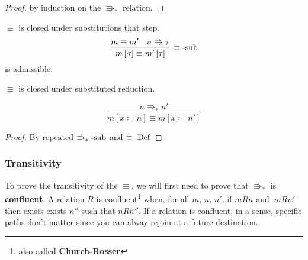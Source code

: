 \begin{proof}
by induction on the $\Rrightarrow_{\ast}$ relation. 
\end{proof}
\begin{lem}
$\equiv$ is closed under substitutions that step.
\[
\frac{m\equiv m'\quad\sigma\Rrightarrow\tau}{m\left[\sigma\right]\equiv m'\left[\tau\right]}\,\operatorname{\equiv-sub}
\]
is admissible.
\end{lem}

\begin{cor}
$\equiv$ is closed under substituted reduction.
\end{cor}

\[
\frac{n\Rrightarrow_{\ast}n'}{m\left[x\coloneqq n\right]\equiv m\left[x\coloneqq n'\right]}
\]

\begin{proof}
By repeated $\operatorname{\Rrightarrow_{\ast}-sub}$ and $\equiv\operatorname{-Def}$
\end{proof}

\subsubsection{Transitivity}

To prove the transitivity of the $\equiv$, we will first need to prove that \textbf{$\Rrightarrow_{\ast}$ }is \textbf{confluent}.
A relation $R$ is confluent\footnote{also called \textbf{Church-Rosser}} when, for all $m$, $n$, $n'$, if $mRn$ and $\:mRn'$ then exists exists $n''$ such that $nRn''$. %
If a relation is confluent, in a sense, specific paths don't matter since you can alway rejoin at a future destination.


